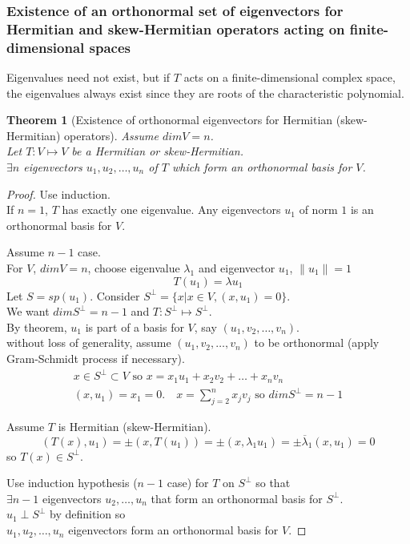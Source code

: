 \documentclass[twoside]{amsart}
\theoremstyle{plain}
\newtheorem{theorem}{Theorem}
\theoremstyle{definition}
\begin{document}
\subsubsection{ Existence of an orthonormal set of eigenvectors for Hermitian and skew-Hermitian operators acting on finite-dimensional spaces }
Eigenvalues need not exist, but if $T$ acts on a finite-dimensional complex space, the eigenvalues always exist since they are roots of the characteristic polynomial.  
\begin{theorem}[Existence of orthonormal eigenvectors for Hermitian (skew-Hermitian) operators]\label{T:Existence_of_eigenvectors_for_Hermitian_operators}
Assume $dim V = n$.  \\
Let $T:V \mapsto V$ be a Hermitian or skew-Hermitian.  \\
$\exists n$ eigenvectors $u_1, u_2, \dots , u_n$ of $T$ which form an orthonormal basis for $V$.  
\end{theorem}
\begin{proof}
Use induction.  \\
If $n=1$, $T$ has exactly one eigenvalue.  Any eigenvectors $u_1$ of norm $1$ is an orthonormal basis for $V$.  

Assume $n-1$ case.  \\
For $V$, $dim V = n$, choose eigenvalue $\lambda_1$ and eigenvector $u_1$, $\| u_1 \| = 1 $ 
\[
T(u_1) = \lambda u_1
\]
Let $S = sp( u_1)$.  Consider $S^{\perp} = \{ x | x \in V, (x,u_1) = 0 \} $.  \\
\phantom{Let} We want $dim S^{\perp} = n-1$ and $T:S^{\perp} \mapsto S^{\perp}$.  \\
\phantom{Let} By theorem, $u_1$ is part of a basis for $V$, say $(u_1,v_2, \dots , v_n)$.  \\
\phantom{Let By} without loss of generality, assume $(u_1,v_2, \dots, v_n)$ to be orthonormal (apply Gram-Schmidt process if necessary).  
\begin{gather*}
  x \in S^{\perp} \subset V \text{ so } x = x_1 u_1 + x_2 v_2 + \dots + x_n v_n \\
  (x,u_1) = x_1 =0.  \quad x = \sum_{j=2}^n x_j v_j \text{ so } dim S^{\perp} = n-1
\end{gather*}

Assume $T$ is Hermitian (skew-Hermitian). 
\[
(T(x),u_1) = \pm (x,T(u_1)) = \pm (x, \lambda_1 u_1) = \pm \overline{\lambda}_1 (x,u_1) = 0
\]
\phantom{Assume} so $T(x) \in S^{\perp}$.  

Use induction hypothesis ($n-1$ case) for $T$ on $S^{\perp}$ so that \\
\phantom{Use} $\exists n-1$ eigenvectors $u_2, \dots, u_n$ that form an orthonormal basis for $S^{\perp}$. \\
$u_1 \perp S^{\perp}$ by definition so \\
\phantom{Use} $u_1,u_2, \dots, u_n$ eigenvectors form an orthonormal basis for $V$.    
\end{proof}
\end{document}

